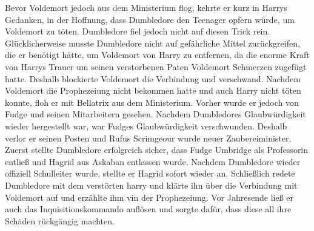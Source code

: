 \documentclass[a4paper, 10pt]{article}
\begin{document}
\vspace{10pt}
\newline
{}  
Bevor Voldemort jedoch aus dem Ministerium flog, kehrte er kurz in Harrys Gedanken, in der Hoffnung, dass Dumbledore den Teenager opfern würde, um Voldemort zu töten. Dumbledore fiel jedoch nicht auf diesen Trick rein. Glücklicherweise musste Dumbledore nicht auf gefährliche Mittel zurückgreifen, die er benötigt hätte, um Voldemort von Harry zu entfernen, da die enorme Kraft von Harrys Trauer um seinen verstorbenen Paten Voldemort Schmerzen zugefügt hatte. Deshalb blockierte Voldemort die Verbindung und verschwand. Nachdem Voldemort die Prophezeiung nicht bekommen hatte und auch Harry nicht töten konnte, floh er mit Bellatrix aus dem Ministerium. Vorher wurde er jedoch von Fudge und seinen Mitarbeitern gesehen. Nachdem Dumbledores Glaubwürdigkeit wieder hergestellt war, war Fudges Glaubwürdigkeit verschwunden. Deshalb verlor er seinen Posten und Rufus Scrimgeour wurde neuer Zaubereiminister. Zuerst stellte Dumbledore erfolgreich sicher, dass Fudge Umbridge als Professorin entließ und Hagrid aus Askaban entlassen wurde. Nachdem Dumbledore wieder offiziell Schulleiter wurde, stellte er Hagrid sofort wieder an. Schließlich redete Dumbledore mit dem verstörten harry und klärte ihn über die Verbindung mit Voldemort auf und erzählte ihm vin der Prophezeiung. Vor Jahresende ließ er auch das Inquisitionskommando auflösen und sorgte dafür, dass diese all ihre Schäden rückgängig machten.
\end{document}
